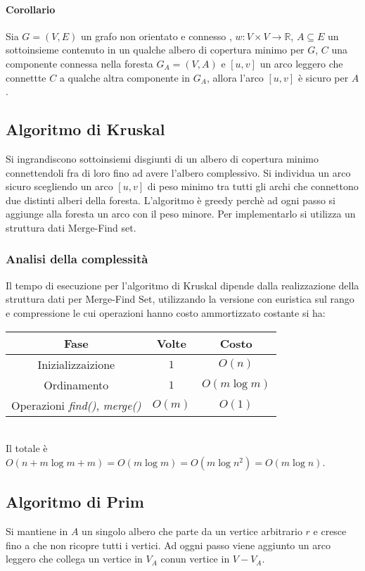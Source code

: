 \paragraph{Corollario}
Sia $G=(V, E)$ un grafo non orientato e connesso , $w:V\times V\rightarrow\mathbb{R}$, $A\subseteq E$ un sottoinsieme contenuto in un qualche albero di copertura minimo per $G$, $C$
una componente connessa nella foresta $G_A=(V, A)$ e $[u, v]$ un arco leggero che connettte $C$ a qualche altra componente in $G_A$, allora l'arco $[u, v]$ \`e sicuro per $A$. 
\subsection{Algoritmo di Kruskal}
Si ingrandiscono sottoinsiemi disgiunti di un albero di copertura minimo connettendoli fra di loro fino ad avere l'albero complessivo. Si individua un arco sicuro scegliendo un arco
$[u, v]$ di peso minimo tra tutti gli archi che connettono due distinti alberi della foresta. L'algoritmo \`e greedy perch\`e ad ogni passo si aggiunge alla foresta un arco con il peso
minore. Per implementarlo si utilizza un struttura dati Merge-Find set.\\

\subsubsection{Analisi della complessit\`a}
Il tempo di esecuzione per l'algoritmo di Kruskal dipende dalla realizzazione della struttura dati per Merge-Find Set, utilizzando la versione con euristica sul rango e compressione le
cui operazioni hanno costo ammortizzato costante si ha:\\
\begin{tabular}{|c|c|c|}
	\hline
	\textbf{Fase} & \textbf{Volte} & \textbf{Costo} \\
	\hline
	Inizializzaizione & $1$ & $O(n)$ \\
	\hline
	Ordinamento & $1$ & $O(m\log m)$ \\
	\hline
	Operazioni \emph{find()}, \emph{merge()} & $O(m)$ & $O(1)$\\
	\hline
\end{tabular}\\
Il totale \`e $O(n+m\log m + m) = O(m\log m) = O(m\log n^2) = O(m\log n)$.
\subsection{Algoritmo di Prim}
Si mantiene in $A$ un singolo albero che parte da un vertice arbitrario $r$ e cresce fino a che non ricopre tutti i vertici. Ad oggni passo viene aggiunto un arco leggero che collega
un vertice in $V_A$ conun vertice in $V-V_A$.
